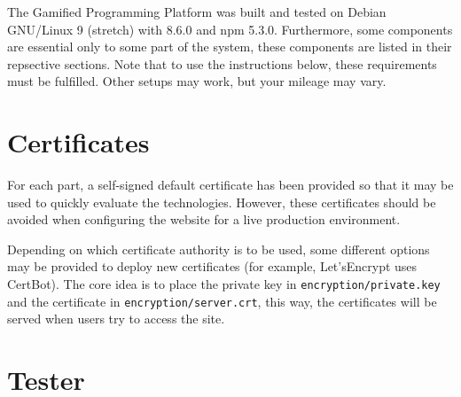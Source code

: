 The Gamified Programming Platform was built and tested on Debian GNU/Linux 9 (stretch) with \nodejs{} 8.6.0 and npm 5.3.0. Furthermore, some components are essential only to some part of the system, these components are listed in their repsective sections. Note that to use the instructions below, these requirements must be fulfilled. Other setups may work, but your mileage may vary.

\section{Certificates}
For each part, a self-signed default certificate has been provided so that it may be used to quickly evaluate the technologies. However, these certificates should be avoided when configuring the website for a live production environment.

Depending on which certificate authority is to be used, some different options may be provided to deploy new certificates (for example, Let'sEncrypt uses CertBot). The core idea is to place the private key in \texttt{encryption/private.key} and the certificate in \texttt{encryption/server.crt}, this way, the certificates will be served when users try to access the site.

\section{Tester}

